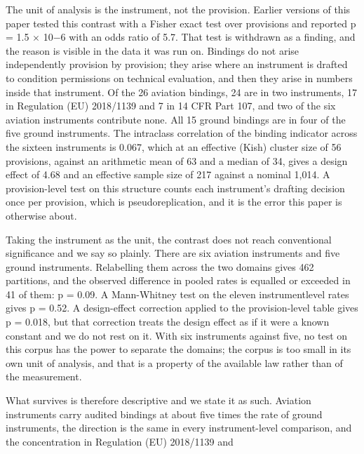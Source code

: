 The unit of analysis is the instrument, not the provision. Earlier versions of this paper tested this contrast with a Fisher exact test over provisions and reported p = 1.5 $\times$ 10$-$6 with an odds ratio of 5.7. That test is withdrawn as a finding, and the reason is visible in the data it was run on. Bindings do not arise independently provision by provision; they arise where an instrument is drafted to condition permissions on technical evaluation, and then they arise in numbers inside that instrument. Of the 26 aviation bindings, 24 are in two instruments, 17 in Regulation (EU) 2018/1139 and 7 in 14 CFR Part 107, and two of the six aviation instruments contribute none. All 15 ground bindings are in four of the five ground instruments. The intraclass correlation of the binding indicator across the sixteen instruments is 0.067, which at an effective (Kish) cluster size of 56 provisions, against an arithmetic mean of 63 and a median of 34, gives a design effect of 4.68 and an effective sample size of 217 against a nominal 1,014. A provision-level test on this structure counts each instrument's drafting decision once per provision, which is pseudoreplication, and it is the error this paper is otherwise about.

Taking the instrument as the unit, the contrast does not reach conventional significance and we say so plainly. There are six aviation instruments and five ground instruments. Relabelling them across the two domains gives 462 partitions, and the observed difference in pooled rates is equalled or exceeded in 41 of them: p = 0.09. A Mann-Whitney test on the eleven instrumentlevel rates gives p = 0.52. A design-effect correction applied to the provision-level table gives p = 0.018, but that correction treats the design effect as if it were a known constant and we do not rest on it. With six instruments against five, no test on this corpus has the power to separate the domains; the corpus is too small in its own unit of analysis, and that is a property of the available law rather than of the measurement.

What survives is therefore descriptive and we state it as such. Aviation instruments carry audited bindings at about five times the rate of ground instruments, the direction is the same in every instrument-level comparison, and the concentration in Regulation (EU) 2018/1139 and

